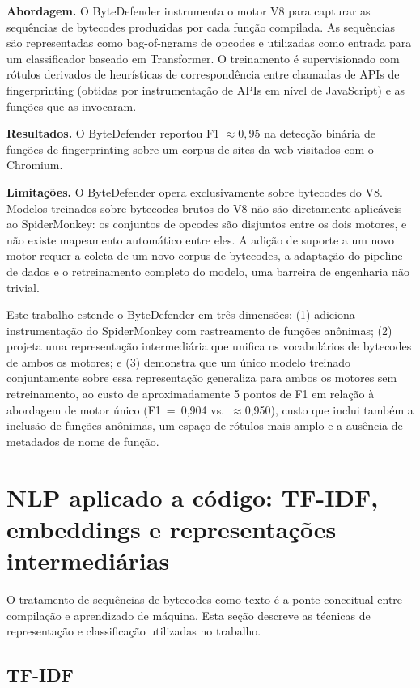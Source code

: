 \textbf{Abordagem.} O ByteDefender instrumenta o motor V8 para capturar as
sequências de bytecodes produzidas por cada função compilada. As sequências são
representadas como bag-of-ngrams de opcodes e utilizadas como entrada para
um classificador baseado em Transformer. O treinamento é supervisionado com rótulos
derivados de heurísticas de correspondência entre chamadas de APIs de
fingerprinting (obtidas por instrumentação de APIs em nível de JavaScript) e
as funções que as invocaram.

\textbf{Resultados.} O ByteDefender reportou F1 $\approx 0{,}95$ na detecção
binária de funções de fingerprinting sobre um corpus de sites da web
visitados com o Chromium.

\textbf{Limitações.} O ByteDefender opera exclusivamente sobre bytecodes do V8.
Modelos treinados sobre bytecodes brutos do V8 não são diretamente aplicáveis ao
SpiderMonkey: os conjuntos de opcodes são disjuntos entre os dois motores, e não
existe mapeamento automático entre eles. A adição de suporte a um novo motor requer
a coleta de um novo corpus de bytecodes, a adaptação do pipeline de dados e o
retreinamento completo do modelo, uma barreira de engenharia não trivial.

Este trabalho estende o ByteDefender em três dimensões: (1) adiciona instrumentação
do SpiderMonkey com rastreamento de funções anônimas; (2) projeta uma representação
intermediária que unifica os vocabulários de bytecodes de ambos os motores; e (3)
demonstra que um único modelo treinado conjuntamente sobre essa representação
generaliza para ambos os motores sem retreinamento, ao custo de aproximadamente 5
pontos de F1 em relação à abordagem de motor único (F1~=~0,904 vs.\
$\approx$0,950), custo que inclui também a inclusão de funções anônimas, um
espaço de rótulos mais amplo e a ausência de metadados de nome de função.

\section{NLP aplicado a código: TF-IDF, embeddings e representações intermediárias}
\label{sec:nlp}

O tratamento de sequências de bytecodes como texto é a ponte conceitual entre
compilação e aprendizado de máquina. Esta seção descreve as técnicas de
representação e classificação utilizadas no trabalho.

\subsection{TF-IDF}
\label{sub:tfidf}

